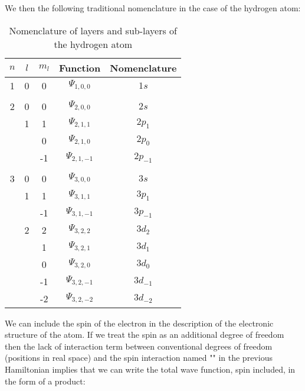 	We then the following traditional nomenclature in the case of the hydrogen atom:
	\begin{table}[H]
	\begin{center}
			\begin{tabular}{|c|c|c|c|c|}
				\hline
				\multicolumn{1}{c}{\cellcolor{black!30}\textbf{$n$}} & 
  \multicolumn{1}{c}{\cellcolor{black!30}\textbf{$l$}} & 
  \multicolumn{1}{c}{\cellcolor{black!30}\textbf{$m_l$}}  & 
  \multicolumn{1}{c}{\cellcolor{black!30}Function} & 
  \multicolumn{1}{c}{\cellcolor{black!30}Nomenclature}\\ \hline
				1 & 0 & 0 & $\Psi_{1,0,0}$ & $1s$\\ \hline
				   &  &  &  & \\ \hline
				2 & 0 & 0 & $\Psi_{2,0,0}$ & $2s$\\ \hline
				   & 1 & 1 & $\Psi_{2,1,1}$ & $2p_1$\\ \hline
				   &   & 0 & $\Psi_{2,1,0}$ & $2p_0$\\ \hline
				   &   & -1 & $\Psi_{2,1,-1}$ & $2p_{-1}$\\ \hline
				   &  &  &  & \\ \hline
				3 & 0 & 0 & $\Psi_{3,0,0}$ & $3s$\\ \hline
				   & 1 & 1 & $\Psi_{3,1,1}$ & $3p_1$\\ \hline
				   &   & -1 & $\Psi_{3,1,-1}$ & $3p_{-1}$\\ \hline
				   &  2 & 2 & $\Psi_{3,2,2}$ & $3d_2$\\ \hline
				   &     & 1 & $\Psi_{3,2,1}$ & $3d_1$\\ \hline
				   &     & 0 & $\Psi_{3,2,0}$ & $3d_0$\\ \hline
				   &     & -1 & $\Psi_{3,2,-1}$ & $3d_{-1}$\\ \hline
				   &     & -2 & $\Psi_{3,2,-2}$ & $3d_{-2}$\\ \hline

		\end{tabular}
	\end{center}
	\caption{Nomenclature of layers and sub-layers of the hydrogen atom}
	\end{table}
	We can include the spin of the electron in the description of the electronic structure of the atom. If we treat the spin as an additional degree of freedom then the lack of interaction term between conventional degrees of freedom (positions in real space) and the spin interaction named "" in the previous Hamiltonian implies that we can write the total wave function, spin included, in the form of a product:
	
